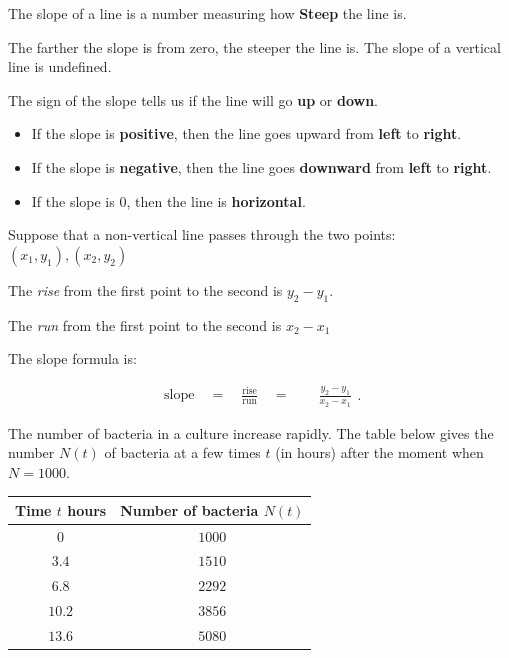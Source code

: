 \label{les_6_unit_1:word_problems_with_average_rate_of_change}

\begin{definition}[Slope]
  \label{def:slope}
  
  The slope of a line is a number measuring how \textbf{Steep} the line is.

  The farther the slope is from zero, the steeper the line is. The slope of a
  vertical line is undefined.

  The sign of the slope tells us if the line will go \textbf{up} or
  \textbf{down}.

  \begin{itemize}
    \label{item:slope_sign}

    \item If the slope is \textbf{positive}, then the line goes upward from
      \textbf{left} to \textbf{right}.
    \item If the slope is \textbf{negative}, then the line goes
      \textbf{downward} from \textbf{left} to \textbf{right}.
    \item If the slope is $0$, then the line is \textbf{horizontal}.
  \end{itemize}

  Suppose that a non-vertical line passes through the two points:
  $\left(x_1, y_1\right), \left(x_2, y_2\right)$ 

  The \textit{rise} from the first point to the second is $y_2 - y_1$.

  The \textit{run} from the first point to the second is $x_2 - x_1$

  The slope formula is:

  \begin{equation}
    \label{eqt:slope_formula}
    \begin{split}
      \textrm{slope} \quad = \quad \frac{\textrm{rise}}{\textrm{run}} \quad =
        \quad \quad \frac{y_2 - y_1}{x_2 - x_1}
    \end{split}
  .\end{equation}
\end{definition}

The number of bacteria in a culture increase rapidly. The table below gives
the number $N(t)$ of bacteria at a few times $t$ (in hours) after the moment
when $N = 1000$.

\begin{table}[H]
  \centering
  \label{tab:bacteria_number}

  \begin{tabular}{|c|c|}
    \hline
    Time $t$ hours & Number of bacteria $N(t)$ \\ \hline
    $0$ & $1000$ \\ \hline
    $3.4$ & $1510$ \\ \hline
    $6.8$ & $2292$ \\ \hline
    $10.2$ & $3856$ \\ \hline
    $13.6$ & $5080$ \\ \hline
  \end{tabular}
\end{table}

